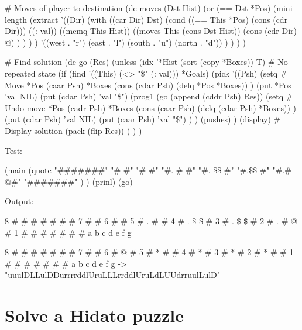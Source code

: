 \begin{wideverbatim}

# Moves of player to destination
(de moves (Dst Hist)
   (or
      (== Dst *Pos)
      (mini length
         (extract
            '((Dir)
               (with ((car Dir) Dst)
                  (cond
                     ((== This *Pos) (cons (cdr Dir)))
                     ((: val))
                     ((memq This Hist))
                     ((moves This (cons Dst Hist))
                        (cons (cdr Dir) @) ) ) ) )
            '((west . "r") (east . "l") (south . "u") (north . "d")) ) ) ) )

# Find solution
(de go (Res)
   (unless (idx '*Hist (sort (copy *Boxes)) T)  # No repeated state
      (if (find '((This) (<> "\$" (: val))) *Goals)
         (pick
            '((Psh)
               (setq  # Move
                  *Pos (caar Psh)
                  *Boxes (cons (cdar Psh) (delq *Pos *Boxes)) )
               (put *Pos 'val NIL)
               (put (cdar Psh) 'val "\$")
               (prog1 (go (append (cddr Psh) Res))
                  (setq  # Undo move
                     *Pos (cadr Psh)
                     *Boxes (cons (caar Psh) (delq (cdar Psh) *Boxes)) )
                  (put (cdar Psh) 'val NIL)
                  (put (caar Psh) 'val "\$") ) )
            (pushes) )
         (display)  # Display solution
         (pack (flip Res)) ) ) )


\end{wideverbatim}

\begin{wideverbatim}


Test:

(main
   (quote
      "#######"
      "#     #"
      "#     #"
      "#. #  #"
      "#. \$\$ #"
      "#.\$\$  #"
      "#.#  @#"
      "#######" ) )
(prinl)
(go)

Output:

 8 # # # # # # #
 7 #           #
 6 #           #
 5 # .   #     #
 4 # .   \$ \$   #
 3 # . \$ \$     #
 2 # . #     @ #
 1 # # # # # # #
   a b c d e f g

 8 # # # # # # #
 7 #           #
 6 # @         #
 5 # *   #     #
 4 # *         #
 3 # *         #
 2 # * #       #
 1 # # # # # # #
   a b c d e f g
-> "uuulDLLulDDurrrrddlUruLLLrrddlUruLdLUUdrruulLulD"

\end{wideverbatim}


\pagebreak{}
\section*{Solve a Hidato puzzle}

